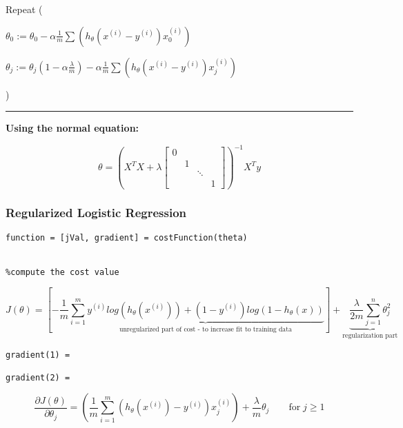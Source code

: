 \documentclass{article}
\begin{document}
Repeat (
    
    $\theta_0 := \theta_0 - \alpha \frac{1}{m} \sum \left(h_{\theta} (x^{(i)} - y^{(i)}) x_0^{(i)} \right)$
    
    $\theta_j := \theta_j (1 - \alpha \frac{\lambda}{m}) - \alpha \frac{1}{m} \sum \left(h_{\theta} (x^{(i)} - y^{(i)}) x_j^{(i)} \right)$
    
)


\par\noindent\rule{\textwidth}{0.4pt}


\textbf{Using the normal equation:}

\begin{equation}
    \theta = \left( X^T X + \lambda \begin{bmatrix} 
    0&&& \\
      &1&& \\
      &&\ddots& \\
      &&& 1 \end{bmatrix} \right)^{-1} X^T y
\end{equation}




\subsubsection{Regularized Logistic Regression}

\begin{verbatim}
function = [jVal, gradient] = costFunction(theta)


%compute the cost value
\end{verbatim}


\begin{equation}
   J(\theta) = \left[ - \frac{1}{m}  \sum_{i=1}^m  \underbrace{y^{(i)} log(h_{\theta} (x^{(i)})) + (1-y^{(i)}) log \left( 1- h_{\theta} (x) \right) }_\textrm{unregularized part of cost - to increase fit to training data} \right] + \underbrace{\frac{\lambda}{2m} \sum_{j=1}^n \theta_j^2}_\textrm{regularization part}
\end{equation}

\begin{verbatim}
gradient(1) = 

gradient(2) = 
\end{verbatim}
\begin{equation}
\frac{\partial J(\theta)}{\partial \theta_j} = \left( \frac{1}{m}\sum_{i=1}^m{\left( h_\theta(x^{(i)})-y^{(i)}\right)x_j^{(i)}} \right)+\frac{\lambda}{m}\theta_j\qquad \mathrm{for}\;j\geq1
\end{equation}
\end{document}

